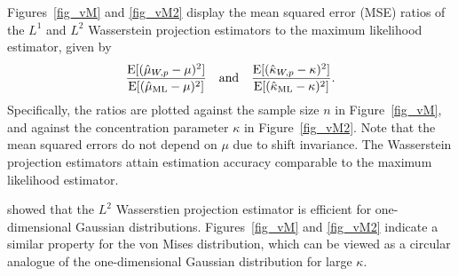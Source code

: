 \documentclass[11pt, a4paper]{article}
\begin{document}
Figures~\ref{fig_vM} and \ref{fig_vM2} display the mean squared error (MSE) ratios of the $L^1$ and $L^2$ Wasserstein projection estimators to the maximum likelihood estimator, given by
\[
\frac{{\rm E}[(\hat{\mu}_{W,p}-\mu)^2]}{{\rm E}[(\hat{\mu}_{\mathrm{ML}}-\mu)^2]} \quad \text{and} \quad \frac{{\rm E}[(\hat{\kappa}_{W,p}-\kappa)^2]}{{\rm E}[(\hat{\kappa}_{\mathrm{ML}}-\kappa)^2]}.
\]
Specifically, the ratios are plotted against the sample size $n$ in Figure~\ref{fig_vM}, and against the concentration parameter $\kappa$ in Figure~\ref{fig_vM2}.
Note that the mean squared errors do not depend on $\mu$ due to shift invariance.
The Wasserstein projection estimators attain estimation accuracy comparable to the maximum likelihood estimator.

\citet{AM2022} showed that the $L^2$ Wasserstien projection estimator is efficient for one-dimensional Gaussian distributions.
Figures~\ref{fig_vM} and \ref{fig_vM2} indicate a similar property for the von Mises distribution, which can be viewed as a circular analogue of the one-dimensional Gaussian distribution for large $\kappa$.
\end{document}
